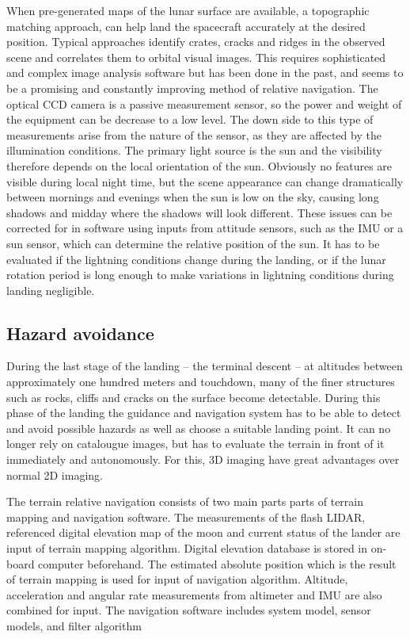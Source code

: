When pre-generated maps of the lunar surface are available, a topographic matching approach, can help land the spacecraft accurately at the desired position. Typical approaches identify crates, cracks and ridges in the observed scene and correlates them to orbital visual images. This requires sophisticated and complex image analysis software but has been done in the past, and seems to be a promising and constantly improving method of relative navigation. The optical CCD camera is a passive measurement sensor, so the power and weight of the equipment can be decrease to a low level. The down side to this type of measurements arise from the nature of the sensor, as they are affected by the illumination conditions. The primary light source is the sun and the visibility therefore depends on the local orientation of the sun. Obviously no features are visible during local night time, but the scene appearance can change dramatically between mornings and evenings when the sun is low on the sky, causing long shadows and midday where the shadows will look different. These issues can be corrected for in software using inputs from attitude sensors, such as the IMU or a sun sensor, which can determine the relative position of the sun. It has to be evaluated if the lightning conditions change during the landing, or if the lunar rotation period is long enough to make variations in lightning conditions during landing negligible. 


\subsection{Hazard avoidance}

During the last stage of the landing – the terminal descent – at altitudes between approximately one hundred meters and touchdown, many of the finer structures such as rocks, cliffs and cracks on the surface become detectable. During this phase of the landing the guidance and navigation system has to be able to detect and avoid possible hazards as well as choose a suitable landing point. It can no longer rely on catalougue images, but has to evaluate the terrain in front of it immediately and autonomously. For this, 3D imaging have great advantages over normal 2D imaging. 

The terrain relative navigation consists of two main parts parts of terrain mapping and navigation software. The measurements of the flash LIDAR, referenced digital elevation map of the moon and current status of the lander are input of terrain mapping algorithm. Digital elevation database is stored in on-board computer beforehand. The estimated absolute position which is the result of terrain mapping is used for input of navigation algorithm. Altitude, acceleration and angular rate measurements from altimeter and IMU are also combined for input. The navigation software includes system model, sensor models, and filter algorithm



